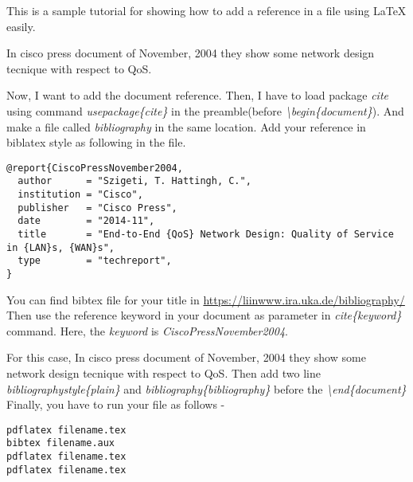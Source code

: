 \documentclass[a4paper,11pt]{article}
\begin{document}
This is a sample tutorial for showing how to add a reference in a file using \LaTeX{} easily.

In cisco press document of November, 2004 they show some network design tecnique with respect to QoS.

Now, I want to add the document reference. Then, I have to load package \textit{cite} using command \textit{usepackage\{cite\}} in the preamble(before \textit{\textbackslash begin\{document\}}). And make a file called \textit{bibliography} in the same location. Add your reference in biblatex style as following in the file.
\begin{verbatim}
@report{CiscoPressNovember2004,
  author      = "Szigeti, T. Hattingh, C.",
  institution = "Cisco",
  publisher   = "Cisco Press",
  date        = "2014-11",
  title       = "End-to-End {QoS} Network Design: Quality of Service in {LAN}s, {WAN}s",
  type        = "techreport",
}
\end{verbatim}
You can find bibtex file for your title in \url{https://liinwww.ira.uka.de/bibliography/}
Then use the reference keyword in your document as parameter in \textit{cite\{keyword\}} command. Here, the \textit{keyword} is \textit{CiscoPressNovember2004}.

For this case, In cisco press document of November, 2004\cite{CiscoPressNovember2004} they show some network design tecnique with respect to QoS.
Then add two line \textit{bibliographystyle\{plain\}} and \textit{bibliography\{bibliography\}} before the \textit{\textbackslash end\{document\}}
Finally, you have to run your file as follows - 
\begin{verbatim}
pdflatex filename.tex
bibtex filename.aux
pdflatex filename.tex
pdflatex filename.tex
\end{verbatim}


\end{document}
